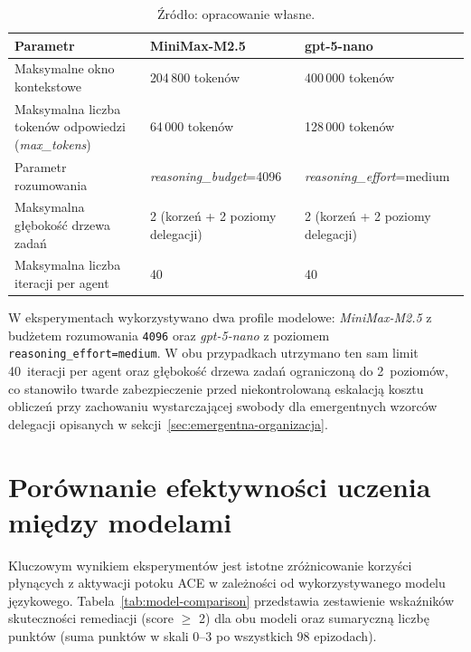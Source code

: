 \begin{table}[H]
    \centering
    \caption{Parametry uruchomieniowe agenta SRE dla dwóch przykładowych konfiguracji modelu (wspólne limity NL i L).}
    \label{tab:agent-config}
    \footnotesize
    \begin{tabular}{p{}p{}p{}}
        \hline
        \textbf{Parametr} & \textbf{MiniMax-M2.5} & \textbf{gpt-5-nano} \\
        \hline
        Maksymalne okno kontekstowe & 204\,800 tokenów & 400\,000 tokenów \\
        Maksymalna liczba tokenów odpowiedzi (\textit{max\_tokens}) & 64\,000 tokenów & 128\,000 tokenów \\
        Parametr rozumowania & \textit{reasoning\_budget}=4096 & \textit{reasoning\_effort}=medium \\
        Maksymalna głębokość drzewa zadań & 2 (korzeń + 2 poziomy delegacji) & 2 (korzeń + 2 poziomy delegacji) \\
        Maksymalna liczba iteracji per agent & 40 & 40 \\
        \hline
    \end{tabular}
    \caption*{\footnotesize Źródło: opracowanie własne.}
\end{table}

W eksperymentach wykorzystywano dwa profile modelowe: \textit{MiniMax-M2.5} z budżetem rozumowania \texttt{4096} oraz \textit{gpt-5-nano} z poziomem \texttt{reasoning\_effort=medium}. W obu przypadkach utrzymano ten sam limit 40~iteracji per agent oraz głębokość drzewa zadań ograniczoną do 2~poziomów, co stanowiło twarde zabezpieczenie przed niekontrolowaną eskalacją kosztu obliczeń przy zachowaniu wystarczającej swobody dla emergentnych wzorców delegacji opisanych w sekcji~\ref{sec:emergentna-organizacja}.

\section{Porównanie efektywności uczenia między modelami}

Kluczowym wynikiem eksperymentów jest istotne zróżnicowanie korzyści płynących z aktywacji potoku ACE w zależności od wykorzystywanego modelu językowego. Tabela~\ref{tab:model-comparison} przedstawia zestawienie wskaźników skuteczności remediacji (score $\geq$ 2) dla obu modeli oraz sumaryczną liczbę punktów (suma punktów w skali 0--3 po wszystkich 98 epizodach).

